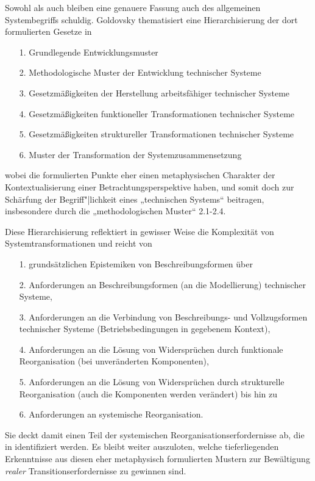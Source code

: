 \documentclass[12pt,a4paper]{article}
\begin{document}
Sowohl \cite{Goldovsky1983} als auch \cite{Rubin2019} bleiben eine genauere
Fassung auch des allgemeinen Systembegriffs schuldig. Goldovsky thematisiert
eine Hierarchisierung der dort formulierten Gesetze in
\begin{itemize}\itemsep0pt
\item[1.] Grundlegende Entwicklungsmuster
\item[2.] Methodologische Muster der Entwicklung technischer Systeme
\item[3.] Gesetzmäßigkeiten der Herstellung arbeitsfähiger technischer Systeme
\item[4.] Gesetzmäßigkeiten funktioneller Transformationen technischer Systeme
\item[5.] Gesetzmäßigkeiten struktureller Transformationen technischer Systeme
\item[6.] Muster der Transformation der Systemzusammensetzung
\end{itemize}
wobei die formulierten Punkte eher einen metaphysischen Charakter der
Kontextualisierung einer Betrachtungsperspektive haben, und somit doch zur
Schärfung der Begriff"|lichkeit eines „technischen Systems“ beitragen,
insbesondere durch die „methodologischen Muster“ 2.1-2.4.

Diese Hierarchisierung reflektiert in gewisser Weise die Komplexität von
Systemtransformationen und reicht von
\begin{itemize}\itemsep0pt
\item[1.] grundsätzlichen Epistemiken von Beschreibungsformen über
\item[2.] Anforderungen an Beschreibungsformen (an die Modellierung)
  technischer Systeme,
\item[3.] Anforderungen an die Verbindung von Beschreibungs- und
  Vollzugsformen technischer Systeme (Betriebsbedingungen in gegebenem
  Kontext),
\item[4.] Anforderungen an die Lösung von Widersprüchen durch funktionale
  Reorganisation (bei unveränderten Komponenten),
\item[5.] Anforderungen an die Lösung von Widersprüchen durch strukturelle
  Reorganisation (auch die Komponenten werden verändert) bis hin zu
\item[6.] Anforderungen an systemische Reorganisation.
\end{itemize}
Sie deckt damit einen Teil der systemischen Reorganisationserfordernisse ab,
die in \cite{Geels2007} identifiziert werden. Es bleibt weiter auszuloten,
welche tieferliegenden Erkenntnisse aus diesen eher metaphysisch formulierten
Mustern zur Bewältigung \emph{realer} Transitionserfordernisse zu gewinnen
sind.
\end{document}
